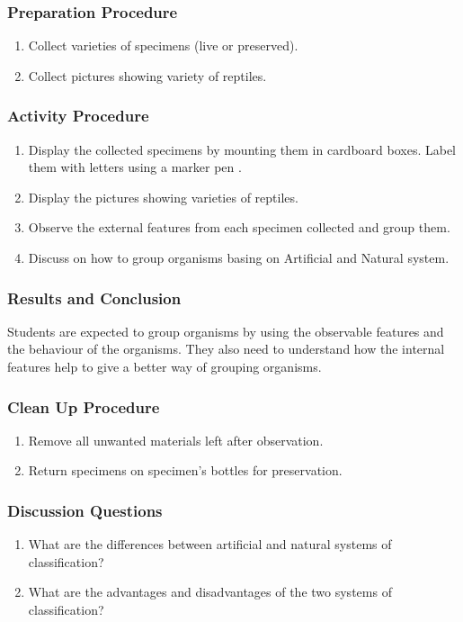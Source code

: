 \subsubsection*{Preparation Procedure}
\begin{enumerate}
\item{Collect varieties of specimens (live or preserved).}
\item{Collect pictures showing variety of reptiles.}
\end{enumerate}

\subsubsection*{Activity Procedure}
\begin{enumerate}
\item{Display the collected specimens by mounting them in cardboard boxes. Label them with letters using a marker pen .}
\item{Display the pictures showing varieties of reptiles.}
\item{Observe the external features from each specimen collected and group them.}
\item{Discuss on how to group organisms basing on Artificial and Natural system.}
\end{enumerate}

\subsubsection*{Results and Conclusion}
Students are expected to group organisms by using the observable features and the behaviour of the organisms. They also need to understand how the internal features help to give a better way of grouping organisms.

\subsubsection*{Clean Up Procedure}
\begin{enumerate}
\item{Remove all unwanted materials left after observation.}
\item{Return specimens on specimen's bottles for preservation.}
\end{enumerate}

\subsubsection*{Discussion Questions}
\begin{enumerate}
\item{What are the differences between artificial and natural systems of classification?}
\item{What are the advantages and disadvantages of the two systems of classification?}
\end{enumerate}

